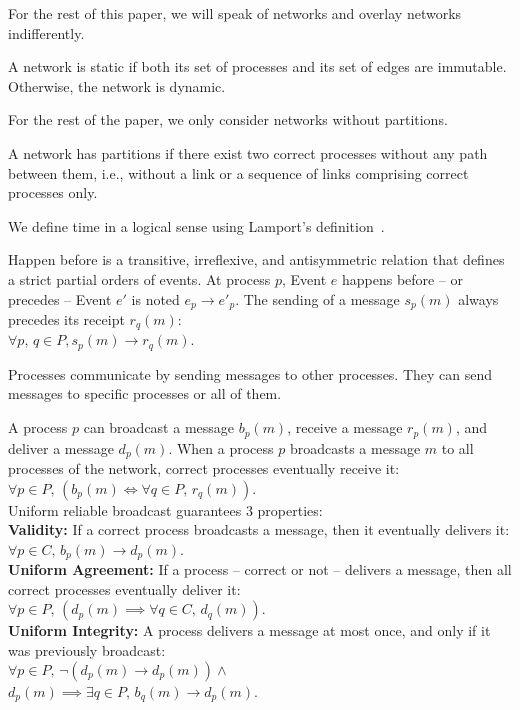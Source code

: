 For the rest of this paper, we will speak of networks and overlay networks
indifferently.

\begin{definition}
  A network is static if both its set of processes and its set of edges are
  immutable. Otherwise, the network is dynamic.
\end{definition}

For the rest of the paper, we only consider networks without partitions.

\begin{definition}
  A network has partitions if there exist two correct processes without any path
  between them, i.e., without a link or a sequence of links comprising correct
  processes only.
\end{definition}


We define time in a logical sense using Lamport's
definition~\cite{lamport1978time}.

\begin{definition}
  Happen before is a transitive, irreflexive, and antisymmetric relation that
  defines a strict partial orders of events. At process $p$, Event $e$ happens
  before -- or precedes -- Event $e'$ is noted $e_p \rightarrow e'_p$. The
  sending of a message $s_p(m)$ always precedes its receipt $r_q(m)$: \\
  $\forall p,\,q \in P, s_p(m) \rightarrow r_q(m)$.
\end{definition}

Processes communicate by sending messages to other processes. They can send
messages to specific processes or all of them.

\begin{definition}
  A process $p$ can broadcast a message $b_p(m)$, receive a message $r_p(m)$,
  and deliver a message $d_p(m)$.  When a process $p$ broadcasts a message $m$
  to all processes of the network, correct processes eventually receive it: 
  $\forall p \in P,\, (b_p(m) \Leftrightarrow \forall q \in P,\, r_q(m))$. \\
  Uniform reliable broadcast guarantees 3 properties: \\
  \textbf{Validity:} If a correct process broadcasts a message, then it
  eventually
  delivers it: $\forall p \in C,\, b_p(m) \rightarrow d_p(m)$. \\
  \textbf{Uniform Agreement:} If a process -- correct or not -- delivers a
  message,
  then all correct processes eventually deliver it:\\
  $\forall p \in P,\, (d_p(m) \implies \forall q \in C,\, d_q(m))$. \\
  \textbf{Uniform Integrity:} A process delivers a message at most once, and
  only if it was previously broadcast:\\
  $\forall p \in P,\, \neg(d_p(m) \rightarrow d_p(m)) \wedge$\\$d_p(m) \implies
  \exists q \in P,\, b_q(m) \rightarrow d_p(m)$.
\end{definition}

